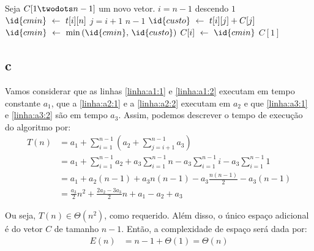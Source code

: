 \begin{codebox}
    \li Seja $C[1 \twodots n - 1]$ um novo vetor. \label{linha:a1:1}
    \li
    \li {} $i = n - 1$ descendo  $1$ \label{linha:for:1}
        \Do
    \li     $\id{cmin} \gets t[i][n]$ \label{linha:a2:1}
    \li     {} $j = i + 1$  $n - 1$ \label{linha:for:2}
            \Do
    \li         $\id{custo} \gets t[i][j] + C[j]$ \label{linha:a3:1}
    \li         $\id{cmin} \gets \min\left(\id{cmin},\, \id{custo}\right)$ \label{linha:a3:2}
            \End
    \li     $C[i] \gets \id{cmin}$ \label{linha:a2:2}
        \End
    \li
    \li {} $C[1]$ \label{linha:a1:2}
\end{codebox}

\subsection{c}

Vamos considerar que as linhas \ref{linha:a1:1} e \ref{linha:a1:2} executam em tempo constante $a_1$, que a \ref{linha:a2:1} e a \ref{linha:a2:2} executam em $a_2$ e que \ref{linha:a3:1} e \ref{linha:a3:2} são em tempo $a_3$. Assim, podemos descrever o tempo de execução do algoritmo por:
\begin{align*}
    T(n) &= a_1 + \sum_{i = 1}^{n - 1}\left(a_2 + \sum_{j = i + 1}^{n - 1} a_3\right) \\
    &= a_1 + \sum_{i = 1}^{n - 1} a_2 + a_3 \sum_{i = 1}^{n - 1} n - a_3 \sum_{i = 1}^{n - 1} i - a_3 \sum_{i = 1}^{n - 1} 1 \\
    &= a_1 + a_2 (n - 1) + a_3 n (n - 1) - a_3 \frac{n (n - 1)}{2} - a_3 (n - 1) \\
    &= \frac{a_3}{2} n^2 + \frac{2 a_2 - 3 a_3}{2} n + a_1 - a_2 + a_3
\end{align*}

Ou seja, $T(n) \in \Theta\left(n^2\right)$, como requerido. Além disso, o único espaço adicional é do vetor $C$ de tamanho $n - 1$. Então, a complexidade de espaço será dada por:
\begin{align*}
    E(n) &= n - 1 + \Theta(1) = \Theta(n)
\end{align*}
